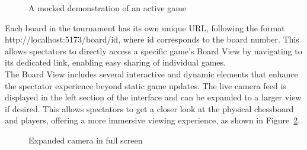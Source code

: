 \begin{figure}[h!] \centering {}\caption[Display of a board]{A mocked demonstration of an active game}\label{fig:board-view-mocked} \end{figure}

Each board in the tournament has its own unique URL, following the format http://localhost:5173/board/{id}, where {id} corresponds to the board number. This allows spectators to directly access a specific game's Board View by navigating to its dedicated link, enabling easy sharing of individual games. \\

The Board View includes several interactive and dynamic elements that enhance the spectator experience beyond static game updates. The live camera feed is displayed in the left section of the interface and can be expanded to a larger view if desired. This allows spectators to get a closer look at the physical chessboard and players, offering a more immersive viewing experience, as shown in Figure~\ref{fig:camera-fullscreen}. \\

\begin{figure}[h!] \centering {}\caption[Camera in full screen]{Expanded camera in full screen}\label{fig:camera-fullscreen} \end{figure}

